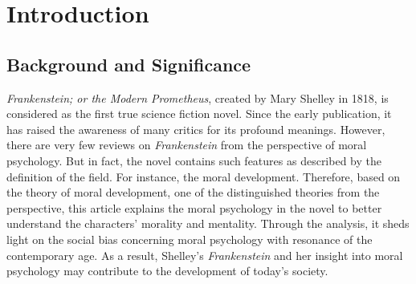 \chapter{Introduction} %
\label{cha:introduction}
\section{Background and Significance} %
\label{sec:background_significance}
\begin{text}

\textit{Frankenstein; or the Modern Prometheus}, created by Mary Shelley in 1818, is considered as the first true science fiction novel. Since the early publication, it has raised the awareness of many critics for its profound meanings. However, there are very few reviews on \textit{Frankenstein} from the perspective of moral psychology. But in fact, the novel contains such features as described by the definition of the field. For instance, the moral development. Therefore, based on the theory of moral development, one of the distinguished theories from the perspective, this article explains the moral psychology in the novel to better understand the characters' morality and mentality. Through the analysis, it sheds light on the social bias concerning moral psychology with resonance of the contemporary age. As a result, Shelley's \textit{Frankenstein} and her insight into moral psychology may contribute to the development of today's society.

\end{text}





